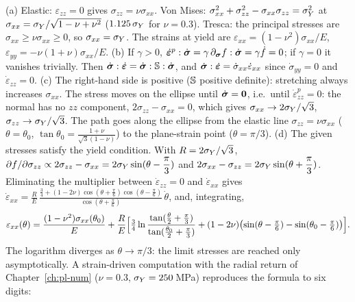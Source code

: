 \begin{solution}
(a) Elastic: $\varepsilon_{zz}=0$ gives $\sigma_{zz}=\nu\sigma_{xx}$. Von Mises:
$\sigma_{xx}^2+\sigma_{zz}^2-\sigma_{xx}\sigma_{zz}=\sigma_{Y}^2$ at
$\sigma_{xx}=\sigma_{Y}/\sqrt{1-\nu+\nu^2}$ ($1.125\,\sigma_{Y}$ for $\nu=0.3$). Tresca: the
principal stresses are $\sigma_{xx}\ge\nu\sigma_{xx}\ge0$, so $\sigma_{xx}=\sigma_{Y}$.
The strains at yield are $\varepsilon_{xx}=(1-\nu^2)\sigma_{xx}/E$,
$\varepsilon_{yy}=-\nu(1+\nu)\sigma_{xx}/E$.
(b) If $\gamma>0$, $\dot{\bm{\varepsilon}}^p:\dot{\bm{\sigma}}=\gamma\,\partial_{\bm{\sigma}}f:\dot{\bm{\sigma}}=\gamma\dot f=0$;
if $\gamma=0$ it vanishes trivially. Then
$\dot{\bm{\sigma}}:\dot{\bm{\varepsilon}}=\dot{\bm{\sigma}}:\mathbb{S}:\dot{\bm{\sigma}}$, and $\dot{\bm{\sigma}}:\dot{\bm{\varepsilon}}=\dot\sigma_{xx}\dot\varepsilon_{xx}$
since $\dot\sigma_{yy}=0$ and $\dot\varepsilon_{zz}=0$.
(c) The right-hand side is positive ($\mathbb{S}$ positive definite): stretching
always increases $\sigma_{xx}$. The stress moves on the ellipse until
$\dot{\bm{\sigma}}=\bm{0}$, i.e.\ until $\dot\varepsilon^p_{zz}=0$: the normal has no
$zz$ component, $2\sigma_{zz}-\sigma_{xx}=0$, which gives
$\sigma_{xx}\to2\sigma_{Y}/\sqrt3$, $\sigma_{zz}\to\sigma_{Y}/\sqrt3$. The path goes along the
ellipse from the elastic line $\sigma_{zz}=\nu\sigma_{xx}$ ($\theta=\theta_0$,
$\displaystyle \tan\theta_0=\frac{1+\nu}{\sqrt3(1-\nu)}$) to the plane-strain point
($\theta=\pi/3$).
(d) The given stresses satisfy the yield condition. With $R=2\sigma_{Y}/\sqrt3$,
$\displaystyle \partial f/\partial\sigma_{zz}\propto2\sigma_{zz}-\sigma_{xx}=2\sigma_{Y}\sin(\theta-\frac\pi3)$
and $\displaystyle 2\sigma_{xx}-\sigma_{zz}=2\sigma_{Y}\sin(\theta+\frac\pi3)$. Eliminating the
multiplier between $\dot\varepsilon_{zz}=0$ and $\dot\varepsilon_{xx}$ gives
$\displaystyle \dot\varepsilon_{xx}=\frac RE\,\frac{\tfrac34+(1-2\nu)\cos(\theta+\frac\pi6)\cos(\theta-\frac\pi6)}{\cos(\theta+\frac\pi6)}\,\dot\theta$,
and, integrating,
\[
  \varepsilon_{xx}(\theta)=\frac{(1-\nu^2)\sigma_{xx}(\theta_0)}{E}
  +\frac RE\Bigl[\tfrac34\ln\frac{\tan(\frac\theta2+\frac\pi3)}{\tan(\frac{\theta_0}2+\frac\pi3)}
  +(1-2\nu)\bigl(\sin(\theta-\tfrac\pi6)-\sin(\theta_0-\tfrac\pi6)\bigr)\Bigr].
\]
The logarithm diverges as $\theta\to\pi/3$: the limit stresses are reached
only asymptotically. A strain-driven computation with the radial return of
Chapter~\ref{ch:pl-num} ($\nu=0.3$, $\sigma_{Y}=250$\,MPa) reproduces the formula to
six digits:

\end{solution}


